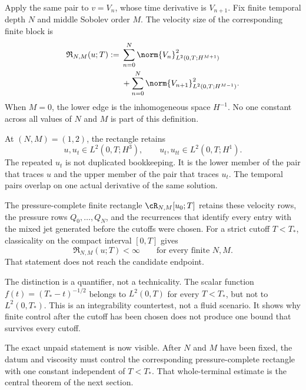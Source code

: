 Apply the same pair to \(v=V_n\), whose time derivative is \(V_{n+1}\).
Fix finite temporal depth \(N\) and middle Sobolev order \(M\).
The velocity size of the corresponding finite block is
\begin{equation}\label{eq:BodyRectangleNorm}
\begin{aligned}
  \mathfrak R_{N,M}(u;T)
  :={}&
  \sum_{n=0}^{N}
  \norm{V_n}_{L^2(0,T;H^{M+1})}^2
  \\
  &+
  \sum_{n=0}^{N}
  \norm{V_{n+1}}_{L^2(0,T;H^{M-1})}^2.
\end{aligned}
\end{equation}
When \(M=0\), the lower edge is the inhomogeneous space \(H^{-1}\).
No one constant across all values of \(N\) and \(M\) is part of this definition.

At \((N,M)=(1,2)\), the rectangle retains
\[
  u,u_t\in L^2(0,T;H^3),
  \qquad
  u_t,u_{tt}\in L^2(0,T;H^1).
\]
The repeated \(u_t\) is not duplicated bookkeeping.
It is the lower member of the pair that traces \(u\) and the upper member of the pair that traces \(u_t\).
The temporal pairs overlap on one actual derivative of the same solution.

The pressure-complete finite rectangle \(\cR_{N,M}[u_0;T]\) retains these velocity rows, the pressure rows \(Q_0,\ldots,Q_N\), and the recurrences that identify every entry with the mixed jet generated before the cutoffs were chosen.
For a strict cutoff \(T<T_*\), classicality on the compact interval \([0,T]\) gives
\begin{equation}\label{eq:StrictSubintervalRectangleBound}
  \mathfrak R_{N,M}(u;T)<\infty
  \qquad\text{for every finite }N,M.
\end{equation}
That statement does not reach the candidate endpoint.

The distinction is a quantifier, not a technicality.
The scalar function \(f(t)=(T_*-t)^{-1/2}\) belongs to \(L^2(0,T)\) for every \(T<T_*\), but not to \(L^2(0,T_*)\).
This is an integrability countertest, not a fluid scenario.
It shows why finite control after the cutoff has been chosen does not produce one bound that survives every cutoff.

The exact unpaid statement is now visible.
After \(N\) and \(M\) have been fixed, the datum and viscosity must control the corresponding pressure-complete rectangle with one constant independent of \(T<T_*\).
That whole-terminal estimate is the central theorem of the next section.
